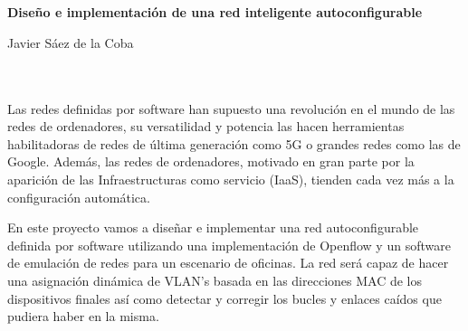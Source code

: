 \chapter*{}





\cleardoublepage
\thispagestyle{empty}

\begin{center}
{\large\bfseries Diseño e implementación de una red inteligente autoconfigurable}\\
\end{center}
\begin{center}
Javier Sáez de la Coba\\
\end{center}

\\

\vspace{0.7cm}
\\


Las redes definidas por software han supuesto una revolución en el mundo de las redes de ordenadores, su versatilidad y potencia las hacen herramientas habilitadoras de redes de última generación como 5G o grandes redes como las de Google. Además, las redes de ordenadores, motivado en gran parte por la aparición de las Infraestructuras como servicio (IaaS), tienden cada vez más a la configuración automática.

En este proyecto vamos a diseñar e implementar una red autoconfigurable definida por software utilizando una implementación de Openflow y un software de emulación de redes para un escenario de oficinas. La red será capaz de hacer una asignación dinámica de VLAN's basada en las direcciones MAC de los dispositivos finales así como detectar y corregir los bucles y enlaces caídos que pudiera haber en la misma.


